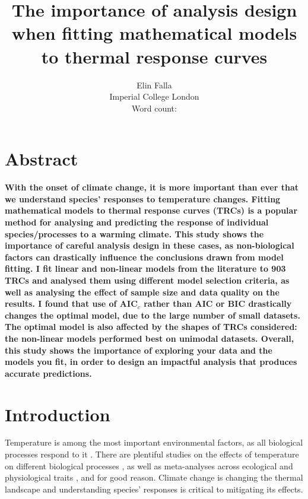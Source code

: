 \documentclass[11pt, a4paper]{article}
\newcommand{\wordcount}{
	
	}
\begin{document}
\setlength{\parskip}{6pt}

\title{The importance of analysis design when fitting mathematical models to thermal response curves}
\author{Elin Falla\\Imperial College London
\\ Word count: \wordcount}
\date{}
\maketitle
\pagebreak

\section*{Abstract}
\textbf{With the onset of climate change, it is more important than ever that we understand species' responses to temperature changes. Fitting mathematical models to thermal response curves (TRCs) is a popular method for analysing and predicting the response of individual species/processes to a warming climate. This study shows the importance of careful analysis design in these cases, as non-biological factors can drastically influence the conclusions drawn from model fitting. I fit linear and non-linear models from the literature to 903 TRCs and analysed them using different model selection criteria, as well as analysing the effect of sample size and data quality on the results. I found that use of AIC$_c$ rather than AIC or BIC drastically changes the optimal model, due to the large number of small datasets. The optimal model is also affected by the shapes of TRCs considered: the non-linear models performed best on unimodal datasets. Overall, this study shows the importance of exploring your data and the models you fit, in order to design an impactful analysis that produces accurate predictions.}

\hrulefill

\section{Introduction}
Temperature is among the most important environmental factors, as all biological processes respond to it \cite{yanEquationModellingTemperature1999}. There are plentiful studies on the effects of temperature on different biological processes \cite{adamsModelFitBiological2017, krenekThermalPerformanceCurves2011, damosTemperatureDrivenModelsInsect2011, zwieteringModelingBacterialGrowth1991}, as well as meta-analyses across ecological and physiological traits \cite{dellSystematicVariationTemperature2011}, and for good reason. Climate change is changing the thermal landscape \cite{pachauriClimateChange20072008} and understanding species' responses is critical to mitigating its effects.
\end{document}
